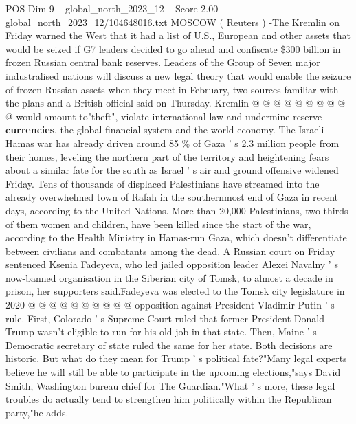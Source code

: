 \begin{textsample}{POS Dim 9 – global\_north\_2023\_12 – Score 2.00 – global\_north\_2023\_12/104648016.txt}
MOSCOW ( Reuters ) -The Kremlin on Friday warned the West that it had a list of U.S., European and other assets that would be seized if G7 leaders decided to go ahead and confiscate \$300 billion in frozen Russian central bank reserves.
Leaders of the Group of Seven major industralised nations will discuss a new legal theory that would enable the seizure of frozen Russian assets when they meet in February, two sources familiar with the plans and a British official said on Thursday.
Kremlin @ @ @ @ @ @ @ @ @ @ would amount to"theft", violate international law and undermine reserve \textbf{currencies}, the global financial system and the world economy.
The Israeli-Hamas war has already driven around 85 \% of Gaza ' s 2.3 million people from their homes, leveling the northern part of the territory and heightening fears about a similar fate for the south as Israel ' s air and ground offensive widened Friday.
Tens of thousands of displaced Palestinians have streamed into the already overwhelmed town of Rafah in the southernmost end of Gaza in recent days, according to the United Nations.
More than 20,000 Palestinians, two-thirds of them women and children, have been killed since the start of the war, according to the Health Ministry in Hamas-run Gaza, which doesn't differentiate between civilians and combatants among the dead.
A Russian court on Friday sentenced Ksenia Fadeyeva, who led jailed opposition leader Alexei Navalny ' s now-banned organisation in the Siberian city of Tomsk, to almost a decade in prison, her supporters said.Fadeyeva was elected to the Tomsk city legislature in 2020 @ @ @ @ @ @ @ @ @ @ opposition against President Vladimir Putin ' s rule.
First, Colorado ' s Supreme Court ruled that former President Donald Trump wasn't eligible to run for his old job in that state.
Then, Maine ' s Democratic secretary of state ruled the same for her state.
Both decisions are historic.
But what do they mean for Trump ' s political fate?"Many legal experts believe he will still be able to participate in the upcoming elections,"says David Smith, Washington bureau chief for The Guardian."What ' s more, these legal troubles do actually tend to strengthen him politically within the Republican party,"he adds.

\end{textsample}
